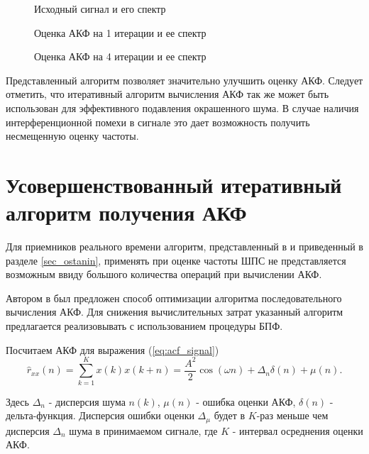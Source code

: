 \begin{figure}[h]
	\center{}
	\caption{Исходный сигнал и его спектр}
	\label{pic:acf_0_iter}
\end{figure}

\begin{figure}[h]
	\center{}
	\caption{Оценка АКФ на 1 итерации и ее спектр}
	\label{pic:acf_1_iter}
\end{figure}

\begin{figure}[h]
	\center{}
	\caption{Оценка АКФ на 4 итерации и ее спектр}
	\label{pic:acf_4_iter}
\end{figure}

Представленный алгоритм позволяет значительно улучшить оценку АКФ. Следует отметить, что итеративный алгоритм вычисления АКФ так же
может быть использован для эффективного подавления окрашенного шума. В случае наличия интерференционной помехи в сигнале это дает
возможность получить несмещенную оценку частоты.

\section{Усовершенствованный итеративный алгоритм получения АКФ}
\label{sec_acf_fft}
Для приемников реального времени алгоритм, представленный в \cite{ostanin_akf} и приведенный в разделе \ref{sec_ostanin}, применять при оценке 
частоты ШПС не представляется возможным ввиду большого количества операций при вычислении АКФ.

Автором в \cite{my_acf} был предложен способ оптимизации алгоритма последовательного вычисления АКФ.
Для снижения вычислительных затрат указанный алгоритм предлагается реализовывать с использованием процедуры БПФ. 

Посчитаем АКФ для выражения (\ref{eq:acf_signal})
\begin{equation}
	\label{eq:lpc_akf_n}
	\hat{r}_{xx}(n) = \sum \limits_{k=1}^{K} x(k)x(k+n) = \frac{A^2}{2} \cos{(\omega{n})} + \Delta_n \delta{(n)} + \mu{(n)}.
\end{equation}

Здесь ${\Delta_n}$ - дисперсия шума ${n(k)}$, ${\mu{(n)}}$ - ошибка оценки АКФ, ${\delta{(n)}}$ - дельта-функция. Дисперсия ошибки
оценки ${\Delta_{\mu}}$ будет в ${K}$-раз меньше чем дисперсия ${\Delta_n}$ шума в принимаемом сигнале, где ${K}$ - интервал
осреднения оценки АКФ.

